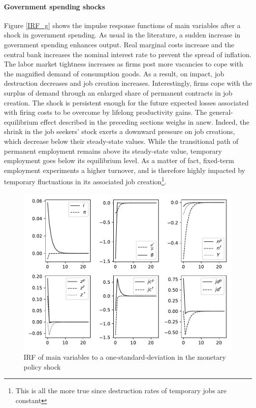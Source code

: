 \documentclass[a4paper]{article}
\begin{document}
\paragraph{Government spending shocks} Figure \ref{IRF_g} shows the impulse response functions of main variables after a shock in government spending. As usual in the literature, a sudden increase in government spending enhances output. Real marginal costs increase and the central bank increases the nominal interest rate to prevent the spread of inflation. The labor market tightness increases as firms post more vacancies to cope with the magnified demand of consumption goods. As a result, on impact, job destruction decreases and job creation increases. Interestingly, firms cope with the surplus of demand through an enlarged share of permanent contracts in job creation. The shock is persistent enough for the future expected losses associated with firing costs to be overcome by lifelong productivity gains. The general-equilibrium effect described in the preceding sections weighs in anew. Indeed, the shrink in the job seekers' stock exerts a downward pressure on job creations, which decrease below their steady-state values. While the transitional path of permanent employment remains above its steady-state value, temporary employment goes below its equilibrium level. As a matter of fact, fixed-term employment experiments a higher turnover, and is therefore highly impacted by temporary fluctuations in its associated job creation\footnote{This is all the more true since destruction rates of temporary jobs are constant}.

\begin{figure}[t]
\includegraphics[scale=1]{IRF_m.pdf}
\caption{IRF of main variables to a one-standard-deviation in the monetary policy shock}
\label{IRF_m}
\end{figure}
\end{document}
